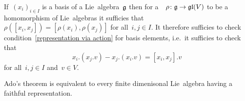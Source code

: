 \begin{remark}
  If~$(x_i)_{i \in I}$ is a basis of a Lie~algebra~$\mathfrak{g}$ then for a~{\linear{$\kf$}}~$\rho \colon \mathfrak{g} \to \mathfrak{gl}(V)$ to be a homomorphism of Lie~algebras it sufficies that~$\rho([x_i,x_j])= [\rho(x_i), \rho(x_j)]$ for all~$i, j \in I$.
  It therefore sufficies to check condition~\eqref{representation via action} for basis elements, i.e.\ it sufficies to check that
  \[
    x_i.(x_j.v) - x_j.(x_i.v)
    = 
    [x_i, x_j].v
  \]
  for all~$i, j \in I$ and~$v \in V$.
\end{remark}


\begin{remark}
  Ado’s theorem is equivalent to every finite dimenisonal Lie~algebra having a faithful representation.
\end{remark}


